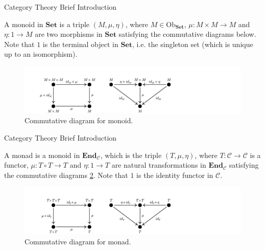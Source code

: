 \documentclass[aspectratio=169,xcolor=dvipsnames,9pt]{beamer}
\begin{document}
\begin{frame}[fragile]{Category Theory Brief Introduction}
	\begin{definition}
		A monoid in $\mathbf{Set}$ is a triple $(M, \mu, \eta)$, where $M \in \text{Ob}_\mathbf{Set}$,
		$\mu:M \times M \to M$ and $\eta: 1 \to M$ are two morphisms in $\mathbf{Set}$ satisfying the
		commutative diagrams below. Note that $1$ is the terminal object in $\mathbf{Set}$, i.e.
		the singleton set (which is unique up to an isomorphism).

		\begin{figure}[H]
			\begin{center}
				\includegraphics[width=1.3\textwidth]{./figures/MonoidalCategory.pdf}
			\end{center}
			\caption{Commutative diagram for monoid.}
			\label{fig:monoid-diagram}
		\end{figure}
		\label{def:monoid-cat}
	\end{definition}
\end{frame}

\begin{frame}[fragile]{Category Theory Brief Introduction}
	\begin{definition}[Monad]
		A monad is a monoid in $\mathbf{End}_\mathcal C$, which is the triple $(T, \mu, \eta)$,
		where $T:\mathcal C \to \mathcal C$ is a functor,
		$\mu:T \circ T \to T$ and $\eta: 1 \to T$ are natural transformations in $\mathbf{End}_\mathcal C$ satisfying the
		commutative diagrams \ref{fig:monad}. Note that $1$ is the identity functor in $\mathcal{C}$.
		\begin{figure}[H]
			\begin{center}
				\includegraphics[width=1.3\textwidth]{./figures/Monad.pdf}
			\end{center}
			\caption{Commutative diagram for monad.}
			\label{fig:monad}
		\end{figure}
	\end{definition}
\end{frame}
\end{document}
